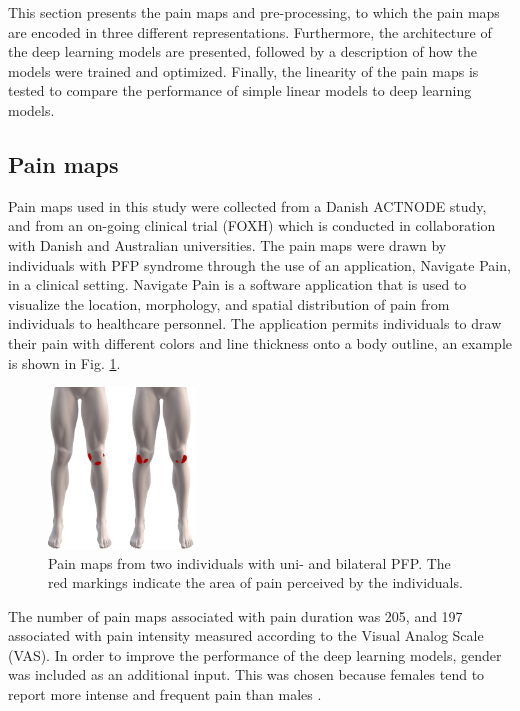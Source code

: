 This section presents the pain maps and pre-processing, to which the pain maps are encoded in three different representations. Furthermore, the architecture of the deep learning models are presented, followed by a description of how the models were trained and optimized. Finally, the linearity of the pain maps is tested to compare the performance of simple linear models to deep learning models.

\subsection{Pain maps}
Pain maps used in this study were collected from a Danish ACTNODE study, and from an on-going clinical trial (FOXH) which is conducted in collaboration with Danish and Australian universities. The pain maps were drawn by individuals with PFP syndrome through the use of an application, Navigate Pain, in a clinical setting. \newline
\noindent
Navigate Pain is a software application that is used to visualize the location, morphology, and spatial distribution of pain from individuals to healthcare personnel. The application permits individuals to draw their pain with different colors and line thickness onto a body outline, an example is shown in Fig. \ref{fig:twoPainmaps}. 

\begin{figure}[H]
\centering
\includegraphics[width=0.35\textwidth]{Figures/twoPainmaps}
\caption{Pain maps from two individuals with uni- and bilateral PFP. The red markings indicate the area of pain perceived by the individuals.}
\label{fig:twoPainmaps}
\end{figure}

\noindent
The number of pain maps associated with pain duration was 205, and 197 associated with pain intensity measured according to the Visual Analog Scale (VAS).
In order to improve the performance of the deep learning models, gender was included as an additional input. This was chosen because females tend to report more intense and frequent pain than males \citep{Pieh2012}. 

